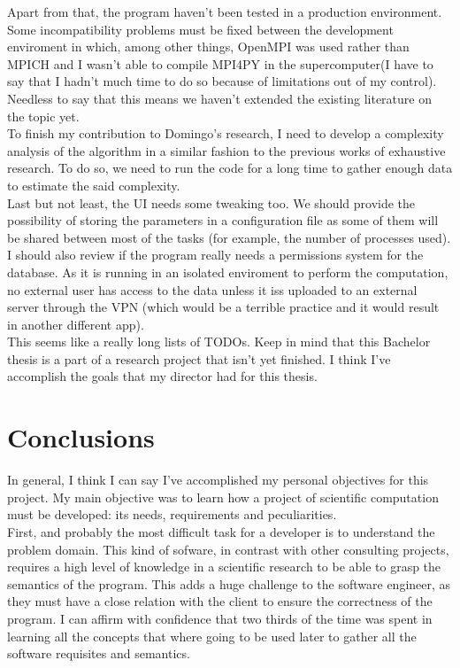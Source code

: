 \documentclass{tfg_domingo}
\begin{document}
  Apart from that, the program haven't been tested in a production environment.
  Some incompatibility problems must be fixed between the development
  enviroment in which, among other things, OpenMPI was used rather than
  MPICH and I wasn't able to compile MPI4PY in the supercomputer(I have to
  say that I hadn't much time to do so because of limitations out of
  my control). Needless to say that this means we haven't extended the
  existing literature on the topic yet.\\

  To finish my contribution to Domingo's research, I need to develop a
  complexity analysis of the algorithm in a similar fashion to the previous
  works of exhaustive research. To do so, we need to run the code for a long
  time to gather enough data to estimate the said complexity.\\

  Last but not least, the UI needs some tweaking too. We should provide the
  possibility of storing the parameters in a configuration file as some of
  them will be shared between most of the tasks (for example, the number of
  processes used). I should also review if the program really needs a
  permissions system for the database. As it is running in an isolated
  enviroment to perform the computation, no external user has access to the
  data unless it iss uploaded to an external server through the VPN (which would
  be a terrible practice and it would result in another different app).\\

  This seems like a really long lists of TODOs. Keep in mind that this
  Bachelor thesis is a part of a research project that isn't yet finished. I
  think I've accomplish the goals that my director had for this thesis.

\chapter{Conclusions}

  In general, I think I can say I've accomplished my personal objectives for
  this project. My main objective was to learn how a project of scientific
  computation must be developed: its needs, requirements and peculiarities.\\

  First, and probably the most difficult task for a developer is to understand
  the problem domain. This kind of sofware, in contrast with other consulting
  projects, requires a high level of knowledge in a scientific research to be
  able to grasp the semantics of the program. This adds a huge challenge to
  the software engineer, as they must have a close relation with the client to
  ensure the correctness of the program. I can affirm with confidence that
  two thirds of the time was spent in learning all the concepts that where
  going to be used later to gather all the software requisites and semantics.\\
\end{document}
